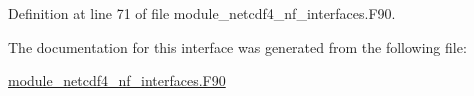 Definition at line 71 of file module\+\_\+netcdf4\+\_\+nf\+\_\+interfaces.\+F90.



The documentation for this interface was generated from the following file\+:\begin{DoxyCompactItemize}
\item 
\hyperlink{module__netcdf4__nf__interfaces_8F90}{module\+\_\+netcdf4\+\_\+nf\+\_\+interfaces.\+F90}\end{DoxyCompactItemize}
